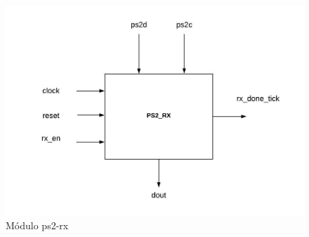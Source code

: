 \documentclass[a4paper,12pt,twoside]{article}
\begin{document}
\begin{figure}[H]
\centering
\includegraphics[scale=0.8]{ps2rx.jpeg}
\caption{Módulo ps2-rx}
\label{fig:ps2rx}
\end{figure}
\end{document}
